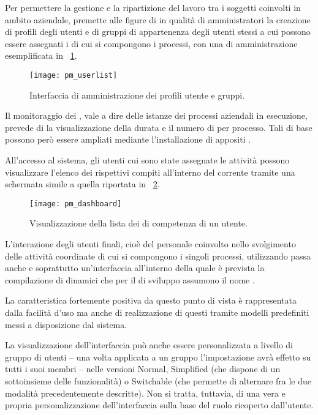 Per permettere la gestione e la ripartizione del lavoro tra i soggetti coinvolti in ambito aziendale, \progname premette alle figure di \bsn {} in qualità di amministratori la creazione di profili degli utenti e di gruppi di appartenenza degli utenti stessi a cui possono essere assegnati i  di cui si compongono i processi, con una  di amministrazione esemplificata in \figurename~\ref{fig:pmuserlist}.

\begin{figure}[H]
  \centering
  \texttt{[image: pm\_userlist]}
  \caption{Interfaccia di amministrazione dei profili utente e gruppi.}
  \label{fig:pmuserlist}
\end{figure}

Il monitoraggio dei , vale a dire delle istanze dei processi aziendali in esecuzione, prevede di  la visualizzazione della durata e il numero di  per processo. Tali  di base possono però essere ampliati mediante l'installazione di appositi .

All'accesso al sistema, gli utenti cui sono state assegnate le attività possono visualizzare l'elenco dei rispettivi compiti all'interno del  corrente tramite una schermata simile a quella riportata in \figurename~\ref{fig:pmtasklist}. 

\begin{figure}[H]
  \centering
  \texttt{[image: pm\_dashboard]}
  \caption{Visualizzazione della lista dei  di competenza di un utente.}
  \label{fig:pmtasklist}
\end{figure}

L'interazione degli utenti finali, cioè del personale coinvolto nello svolgimento delle attività coordinate di cui si compongono i singoli processi, utilizzando \progname passa anche e soprattutto un'interfaccia  all'interno della quale è prevista la compilazione di  dinamici che per il  di sviluppo assumono il nome .

La caratteristica fortemente positiva da questo punto di vista è rappresentata dalla facilità d'uso ma anche di realizzazione di questi  tramite modelli predefiniti messi a disposizione dal sistema.

La visualizzazione dell'interfaccia può anche essere personalizzata a livello di gruppo di utenti -- una volta applicata a un gruppo l'impostazione avrà effetto su tutti i suoi membri -- nelle versioni \textsf{Normal}, \textsf{Simplified} (che dispone di un sottoinsieme delle funzionalità) o \textsf{Switchable} (che permette di alternare fra le due modalità precedentemente descritte). Non si tratta, tuttavia, di una vera e propria personalizzazione dell'interfaccia sulla base del ruolo ricoperto dall'utente.
	
